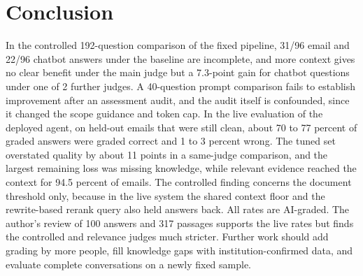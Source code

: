 \documentclass[a4paper,10pt,twocolumn]{article}
\begin{document}
\section{Conclusion}
In the controlled 192-question comparison of the fixed pipeline, 31/96 email and 22/96 chatbot answers under the baseline are incomplete, and more context gives no clear benefit under the main judge but a 7.3-point gain for chatbot questions under one of 2 further judges. A 40-question prompt comparison fails to establish improvement after an assessment audit, and the audit itself is confounded, since it changed the scope guidance and token cap. In the live evaluation of the deployed agent, on held-out emails that were still clean, about 70 to 77 percent of graded answers were graded correct and 1 to 3 percent wrong. The tuned set overstated quality by about 11 points in a same-judge comparison, and the largest remaining loss was missing knowledge, while relevant evidence reached the context for 94.5 percent of emails. The controlled finding concerns the document threshold only, because in the live system the shared context floor and the rewrite-based rerank query also held answers back. All rates are AI-graded. The author's review of 100 answers and 317 passages supports the live rates but finds the controlled and relevance judges much stricter. Further work should add grading by more people, fill knowledge gaps with institution-confirmed data, and evaluate complete conversations on a newly fixed sample.

\footnotesize\setlength{\itemsep}{0pt}\setlength{\parsep}{0pt}


\end{document}
